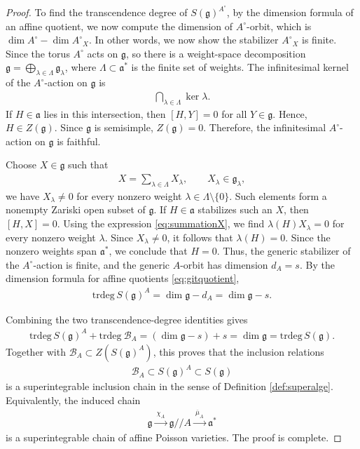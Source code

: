 \documentclass[11pt,reqno]{amsart}
\newtheorem*{theorem A}{Main Theorem A}
\newtheorem*{theorem B}{Main Theorem B}
\newtheorem*{theorem C}{Main Theorem C}
\newtheorem*{theorem D}{Main Theorem D}
\theoremstyle{definition}
\theoremstyle{plain}
\theoremstyle{conclusion}
\begin{document}
\begin{proof}
To find the transcendence degree of $S(\mathfrak{g})^{A^\circ}$, by the dimension formula of an affine quotient, we now compute the dimension of $A^\circ$-orbit, which is $\dim A^\circ - \dim {A^\circ}_X$. In other words, we now show the stabilizer ${A^\circ}_X$ is finite. Since the torus $A^\circ$ acts on $\mathfrak{g}$, so there is a weight-space decomposition  $\mathfrak{g} = \bigoplus_{\lambda\in\Lambda}\mathfrak{g}_\lambda$, where $\Lambda\subset\mathfrak{a}^*$ is the finite set of weights. The infinitesimal kernel of the $A^\circ$-action on $\mathfrak{g}$ is \begin{align*}
\bigcap_{\lambda \in \Lambda}\ker\lambda.
\end{align*} If $H\in\mathfrak{a}$ lies in this intersection, then $[H,Y] =0$ for all $Y\in\mathfrak{g}$. Hence, $H\in Z(\mathfrak{g})$. Since $\mathfrak{g}$ is semisimple, $Z(\mathfrak{g})=0$. Therefore, the infinitesimal $A^\circ$-action on $\mathfrak{g}$ is faithful.

Choose $X\in\mathfrak{g}$ such that  \begin{align}
X =  \sum_{\lambda\in\Lambda}X_\lambda,\qquad X_\lambda\in\mathfrak{g}_\lambda, \label{eq:summationX}
\end{align} we have $X_\lambda\neq 0$ for every nonzero weight $\lambda\in\Lambda\setminus\{0\}$. Such elements form a nonempty Zariski open subset of $\mathfrak{g}$. If $H\in\mathfrak{a}$ stabilizes such an $X$, then $[H,X] = 0$. Using the expression \eqref{eq:summationX}, we  find $\lambda(H)X_\lambda = 0$ for every nonzero weight $\lambda$. Since $X_\lambda \neq 0$, it follows that $\lambda(H) = 0$. Since the nonzero weights span $\mathfrak{a}^*$, we conclude that $H=0$. Thus, the generic stabilizer of the $A^\circ$-action is finite, and the generic $A$-orbit has dimension $d_A = s$. By the dimension formula for affine quotients \eqref{eq:gitquotient}, \begin{align*}
\mathrm{trdeg} \, S(\mathfrak{g})^A = \dim\mathfrak{g}-d_A = \dim\mathfrak{g}-s.
\end{align*}

Combining the two transcendence-degree identities gives \begin{align*}
\mathrm{trdeg} \, S(\mathfrak{g})^A + \mathrm{trdeg} \ \mathcal{B} _A = (\dim \mathfrak{g}-s) + s = \dim\mathfrak{g} = \mathrm{trdeg} \, S(\mathfrak{g}).
\end{align*} Together with $  \mathcal{B}_A\subset Z \left(S(\mathfrak{g})^A\right)$, this proves that the inclusion relations \begin{align*}
\mathcal{B}_A\subset S(\mathfrak{g})^A\subset S(\mathfrak{g})
\end{align*} is a superintegrable inclusion chain in the sense of Definition \ref{def:superalge}. Equivalently, the induced chain \begin{align*}
\mathfrak{g} \xrightarrow{\ \chi_A\ } \mathfrak{g}//A
\xrightarrow{\ \overline{\mu}_A\ } \mathfrak{a}^*
\end{align*} is a superintegrable chain of affine Poisson varieties. The proof is complete.
\end{proof}
\end{document}
